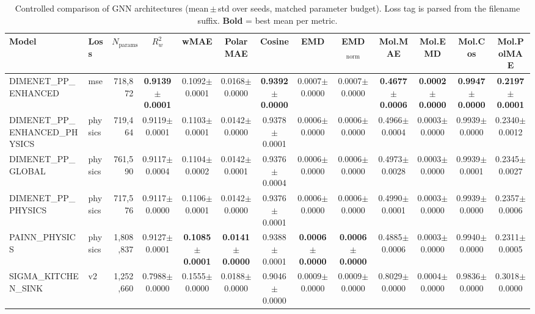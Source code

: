 \begin{table}[ht]
\centering
\caption{Controlled comparison of GNN architectures (mean\,$\pm$\,std over seeds, matched parameter budget). Loss tag is parsed from the filename suffix. \textbf{Bold} = best mean per metric.}
\label{tab:benchmark}
\small
\begin{tabular}{l l r c c c c c c c c c c }
\toprule
Model & Loss & $N_{\text{params}}$ & $R^2_w$ & wMAE & PolarMAE & Cosine & EMD & EMD$_\mathrm{norm}$ & Mol.MAE & Mol.EMD & Mol.Cos & Mol.PolMAE \\
\midrule
DIMENET_PP_ENHANCED & mse & 718,872 & \textbf{0.9139$\pm$0.0001} & 0.1092$\pm$0.0001 & 0.0168$\pm$0.0000 & \textbf{0.9392$\pm$0.0000} & 0.0007$\pm$0.0000 & 0.0007$\pm$0.0000 & \textbf{0.4677$\pm$0.0006} & \textbf{0.0002$\pm$0.0000} & \textbf{0.9947$\pm$0.0000} & \textbf{0.2197$\pm$0.0001} \\
DIMENET_PP_ENHANCED_PHYSICS & physics & 719,464 & 0.9119$\pm$0.0001 & 0.1103$\pm$0.0001 & 0.0142$\pm$0.0000 & 0.9378$\pm$0.0001 & 0.0006$\pm$0.0000 & 0.0006$\pm$0.0000 & 0.4966$\pm$0.0004 & 0.0003$\pm$0.0000 & 0.9939$\pm$0.0000 & 0.2340$\pm$0.0012 \\
DIMENET_PP_GLOBAL & physics & 761,590 & 0.9117$\pm$0.0004 & 0.1104$\pm$0.0002 & 0.0142$\pm$0.0001 & 0.9376$\pm$0.0004 & 0.0006$\pm$0.0000 & 0.0006$\pm$0.0000 & 0.4973$\pm$0.0028 & 0.0003$\pm$0.0000 & 0.9939$\pm$0.0001 & 0.2345$\pm$0.0027 \\
DIMENET_PP_PHYSICS & physics & 717,576 & 0.9117$\pm$0.0000 & 0.1106$\pm$0.0001 & 0.0142$\pm$0.0000 & 0.9376$\pm$0.0001 & 0.0006$\pm$0.0000 & 0.0006$\pm$0.0000 & 0.4990$\pm$0.0001 & 0.0003$\pm$0.0000 & 0.9939$\pm$0.0000 & 0.2357$\pm$0.0006 \\
PAINN_PHYSICS & physics & 1,808,837 & 0.9127$\pm$0.0001 & \textbf{0.1085$\pm$0.0001} & \textbf{0.0141$\pm$0.0000} & 0.9388$\pm$0.0001 & \textbf{0.0006$\pm$0.0000} & \textbf{0.0006$\pm$0.0000} & 0.4885$\pm$0.0006 & 0.0003$\pm$0.0000 & 0.9940$\pm$0.0000 & 0.2311$\pm$0.0005 \\
SIGMA_KITCHEN_SINK & v2 & 1,252,660 & 0.7988$\pm$0.0000 & 0.1555$\pm$0.0000 & 0.0188$\pm$0.0000 & 0.9046$\pm$0.0000 & 0.0009$\pm$0.0000 & 0.0009$\pm$0.0000 & 0.8029$\pm$0.0000 & 0.0004$\pm$0.0000 & 0.9836$\pm$0.0000 & 0.3018$\pm$0.0000 \\
\bottomrule
\end{tabular}
\end{table}
